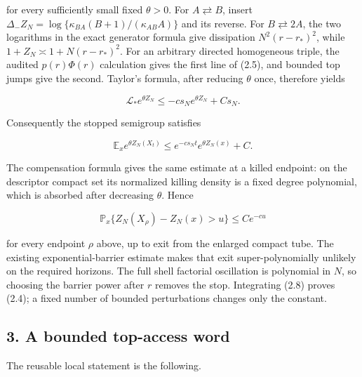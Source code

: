 for every sufficiently small fixed \(\theta>0\). For
\(A\rightleftarrows B\), insert
\(\Delta_-Z_N=\log\{\kappa_{BA}(B+1)/(\kappa_{AB}A)\}\) and its reverse.
For \(B\rightleftarrows2A\), the two logarithms in the exact generator
formula give dissipation \(N^2(r-r_*)^2\), while
\(1+Z_N\asymp1+N(r-r_*)^2\). For an arbitrary directed homogeneous
triple, the audited \(p(r)\Phi(r)\) calculation gives the first line of
(2.5), and bounded top jumps give the second. Taylor's formula, after
reducing \(\theta\) once, therefore yields

\[
 \mathcal L_*e^{\theta Z_N}
 \le-cs_Ne^{\theta Z_N}+Cs_N .                       \tag{2.6}
\]

Consequently the stopped semigroup satisfies

\[
 \mathbb E_xe^{\theta Z_N(X_t)}
 \le e^{-cs_Nt}e^{\theta Z_N(x)}+C.                  \tag{2.7}
\]

The compensation formula gives the same estimate at a killed endpoint:
on the descriptor compact set its normalized killing density is a fixed
degree polynomial, which is absorbed after decreasing \(\theta\). Hence

\[
 \mathbb P_x\{Z_N(X_\rho)-Z_N(x)>u\}\le Ce^{-cu}     \tag{2.8}
\]

for every endpoint \(\rho\) above, up to exit from the enlarged compact
tube. The existing exponential-barrier estimate makes that exit
super-polynomially unlikely on the required horizons. The full shell
factorial oscillation is polynomial in \(N\), so choosing the barrier
power after \(r\) removes the stop. Integrating (2.8) proves (2.4); a
fixed number of bounded perturbations changes only the constant.

\subsection{3. A bounded top-access
word}

The reusable local statement is the following.

